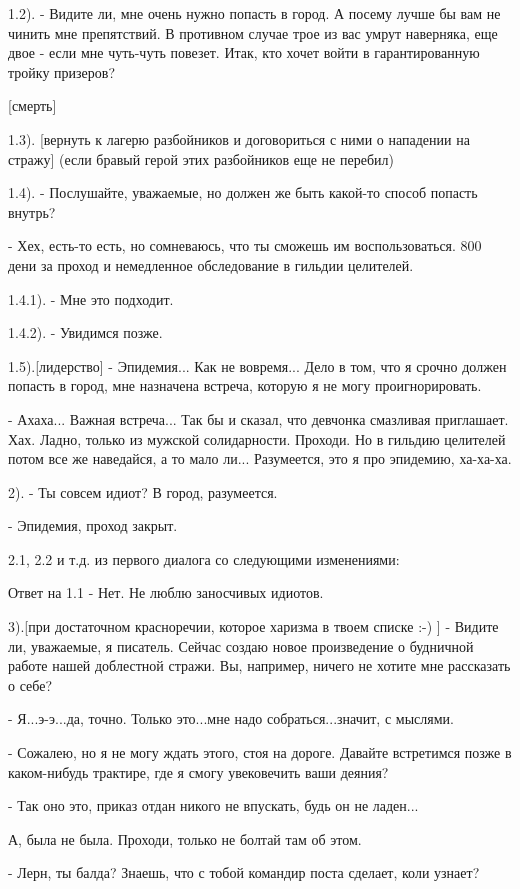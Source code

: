 \documentclass[12pt,a4paper]{book}
\begin{document}
1.2). - Видите ли, мне очень нужно попасть в город. А посему лучше бы вам не чинить мне препятствий. В противном случае трое из вас умрут наверняка, еще двое - если мне чуть-чуть повезет. Итак, кто хочет войти в гарантированную тройку призеров?

[смерть]

1.3). [вернуть к лагерю разбойников и договориться с ними о нападении на стражу] (если бравый герой этих разбойников еще не перебил)

1.4). - Послушайте, уважаемые, но должен же быть какой-то способ попасть внутрь?

- Хех, есть-то есть, но сомневаюсь, что ты сможешь им воспользоваться. 800 дени за проход и немедленное обследование в гильдии целителей.

1.4.1). - Мне это подходит.

1.4.2). - Увидимся позже.

1.5).[лидерство] - Эпидемия... Как не вовремя... Дело в том, что я срочно должен попасть в город, мне назначена встреча, которую я не могу проигнорировать.

- Ахаха... Важная встреча... Так бы и сказал, что девчонка смазливая приглашает. Хах. Ладно, только из мужской солидарности. Проходи. Но в гильдию целителей потом все же наведайся, а то мало ли... Разумеется, это я про эпидемию, ха-ха-ха.

2). - Ты совсем идиот? В город, разумеется.

- Эпидемия, проход закрыт.

2.1, 2.2 и т.д. из первого диалога со следующими изменениями:

Ответ на 1.1 - Нет. Не люблю заносчивых идиотов.

3).[при достаточном красноречии, которое харизма в твоем списке :-) ] - Видите ли, уважаемые, я писатель. Сейчас создаю новое произведение о будничной работе нашей доблестной стражи. Вы, например, ничего не хотите мне рассказать о себе?

- Я...э-э...да, точно. Только это...мне надо собраться...значит, с мыслями.

- Сожалею, но я не могу ждать этого, стоя на дороге. Давайте встретимся позже в каком-нибудь трактире, где я смогу увековечить ваши деяния?

- Так оно это, приказ отдан никого не впускать, будь он не ладен...

А, была не была. Проходи, только не болтай там об этом. 

- Лерн, ты балда? Знаешь, что с тобой командир поста сделает, коли узнает?
\end{document}
